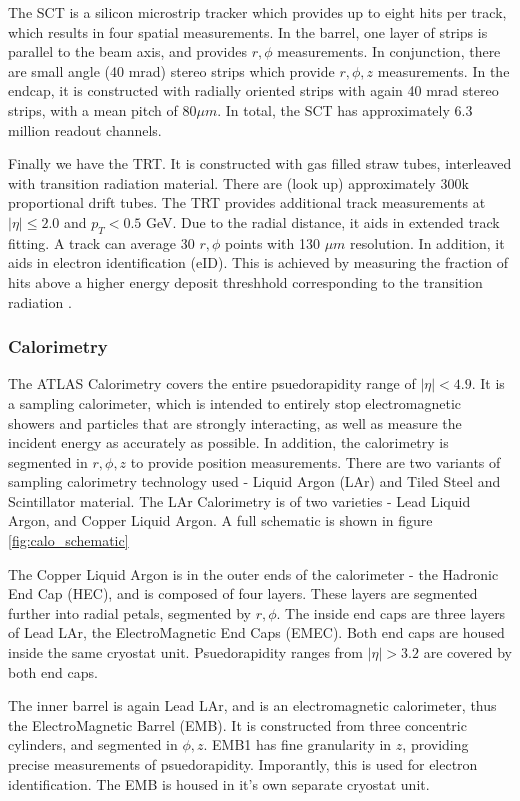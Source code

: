 \documentclass[12pt]{article}
\begin{document}
The SCT is a silicon microstrip tracker which provides up to eight hits per
track, which results in four spatial measurements. In the barrel, one layer of
strips is parallel to the beam axis, and provides $r,\phi$ measurements. In
conjunction, there are small angle (40 mrad) stereo strips which provide
$r,\phi,z$ measurements. In the endcap, it is constructed with radially oriented
strips with again 40 mrad stereo strips, with a mean pitch of $80 \mu m$. In
total, the SCT has approximately 6.3 million readout channels.

Finally we have the TRT. It is constructed with gas filled straw tubes,
interleaved with transition radiation material. There are (look up)
approximately 300k proportional drift tubes. The TRT provides additional track
measurements at $|\eta| \leq 2.0$ and $p_T<0.5$ GeV. Due to the radial distance,
it aids in extended track fitting. A track can average 30 $r,\phi$ points with
130 $\mu m$ resolution. In addition, it aids in electron identification (eID).
This is achieved by measuring the fraction of hits above a higher energy deposit
threshhold corresponding to the transition radiation \cite{Aad_2024}.

\subsubsection{Calorimetry}

The ATLAS Calorimetry covers the entire psuedorapidity range of $|\eta| < 4.9$.
It is a sampling calorimeter, which is intended to entirely stop electromagnetic
showers and particles that are strongly interacting, as well as measure the
incident energy as accurately as possible. In addition, the calorimetry is
segmented in $r, \phi, z$ to provide position measurements. There are two
variants of sampling calorimetry technology used - Liquid Argon (LAr) and Tiled
Steel and Scintillator material. The LAr Calorimetry is of two varieties - Lead
Liquid Argon, and Copper Liquid Argon. A full schematic is shown in figure
\ref{fig:calo_schematic}

The Copper Liquid Argon is in the outer ends of the calorimeter - the Hadronic
End Cap (HEC), and is composed of four layers. These layers are segmented
further into radial petals, segmented by $r,\phi$. The inside end caps are three
layers of Lead LAr, the ElectroMagnetic End Caps (EMEC). Both end caps are
housed inside the same cryostat unit. Psuedorapidity ranges from $|\eta|>3.2$
are covered by both end caps.

The inner barrel is again Lead LAr, and is an electromagnetic calorimeter, thus
the ElectroMagnetic Barrel (EMB). It is constructed from three concentric
cylinders, and segmented in $\phi, z$. EMB1 has fine granularity in $z$,
providing precise measurements of psuedorapidity. Imporantly, this is used for
electron identification. The EMB is housed in it's own separate cryostat unit.
\end{document}
